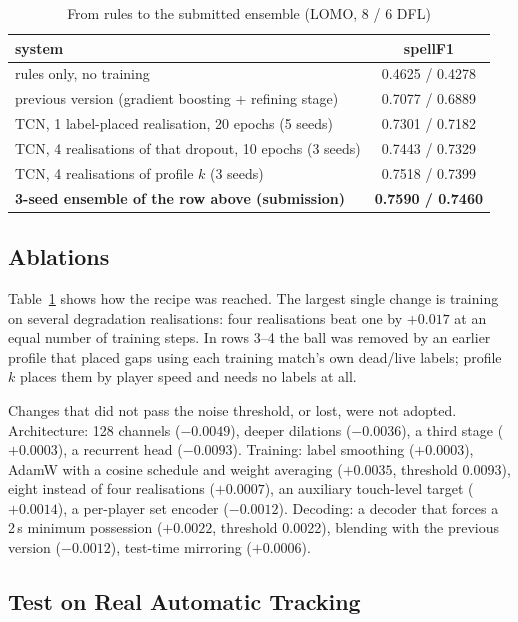 \documentclass[conference]{IEEEtran}
\newcommand{\spf}{spellF1}
\newcommand{\lomo}{LOMO}
\begin{document}
\begin{table}[t]
\caption{From rules to the submitted ensemble (\lomo, 8 / 6 DFL)}
\label{tab:steps}
\centering
\footnotesize
\begin{tabularx}{\columnwidth}{@{}>{\raggedright\arraybackslash}X c@{}}
\toprule
system & \spf{}\\
\midrule
rules only, no training & 0.4625 / 0.4278\\
previous version (gradient boosting + refining stage) & 0.7077 / 0.6889\\
TCN, 1 label-placed realisation, 20 epochs (5 seeds) & 0.7301 / 0.7182\\
TCN, 4 realisations of that dropout, 10 epochs (3 seeds) & 0.7443 / 0.7329\\
TCN, 4 realisations of profile $k$ (3 seeds) & 0.7518 / 0.7399\\
\textbf{3-seed ensemble of the row above (submission)} & \textbf{0.7590 / 0.7460}\\
\bottomrule
\end{tabularx}
\end{table}

\subsection{Ablations}

Table~\ref{tab:steps} shows how the recipe was reached. The largest single change is training on several degradation
realisations: four realisations beat one by $+0.017$ at an equal number of training steps. In rows 3--4 the ball
was removed by an earlier profile that placed gaps using each training match's own dead/live labels; profile~$k$
places them by player speed and needs no labels at all.

Changes that did not pass the noise threshold, or lost, were not adopted. Architecture: 128 channels ($-0.0049$),
deeper dilations ($-0.0036$), a third stage ($+0.0003$), a recurrent head ($-0.0093$). Training: label smoothing
($+0.0003$), AdamW with a cosine schedule and weight averaging ($+0.0035$, threshold 0.0093), eight instead of four
realisations ($+0.0007$), an auxiliary touch-level target ($+0.0014$), a per-player set encoder ($-0.0012$).
Decoding: a decoder that forces a 2\,s minimum possession ($+0.0022$, threshold 0.0022), blending with the previous
version ($-0.0012$), test-time mirroring ($+0.0006$).

\subsection{Test on Real Automatic Tracking}
\end{document}
